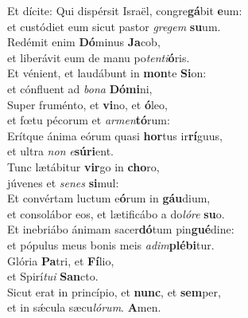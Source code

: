 \evenverse Et dícite: Qui dispérsit Israël, congre\textbf{gá}bit \textbf{e}um:~\*\\
\evenverse et custódiet eum sicut pastor \textit{gre}\textit{gem} \textbf{su}um.\\
\oddverse Redémit enim \textbf{Dó}minus \textbf{Ja}cob,~\*\\
\oddverse et liberávit eum de manu po\textit{ten}\textit{ti}\textbf{ó}ris.\\
\evenverse Et vénient, et laudábunt in \textbf{mon}te \textbf{Si}on:~\*\\
\evenverse et cónfluent ad \textit{bo}\textit{na} \textbf{Dó}\textbf{mi}ni,\\
\oddverse Super fruménto, et \textbf{vi}no, et \textbf{ó}leo,~\*\\
\oddverse et fœtu pécorum et \textit{ar}\textit{men}\textbf{tó}rum:\\
\evenverse Erítque ánima eórum quasi \textbf{hor}tus ir\textbf{rí}guus,~\*\\
\evenverse et ultra \textit{non} \textit{e}\textbf{sú}\textbf{ri}ent.\\
\oddverse Tunc lætábitur \textbf{vir}go in \textbf{cho}ro,~\*\\
\oddverse júvenes et \textit{se}\textit{nes} \textbf{si}mul:\\
\evenverse Et convértam luctum e\textbf{ó}rum in \textbf{gáu}dium,~\*\\
\evenverse et consolábor eos, et lætificábo a do\textit{ló}\textit{re} \textbf{su}o.\\
\oddverse Et inebriábo ánimam sacer\textbf{dó}tum pin\textbf{gué}dine:~\*\\
\oddverse et pópulus meus bonis meis \textit{a}\textit{dim}\textbf{plé}\textbf{bi}tur.\\
\evenverse Glória \textbf{Pa}tri, et \textbf{Fí}lio,~\*\\
\evenverse et Spirí\textit{tu}\textit{i} \textbf{San}cto.\\
\oddverse Sicut erat in princípio, et \textbf{nunc}, et \textbf{sem}per,~\*\\
\oddverse et in sǽcula sæcu\textit{ló}\textit{rum}. \textbf{A}men.\\
